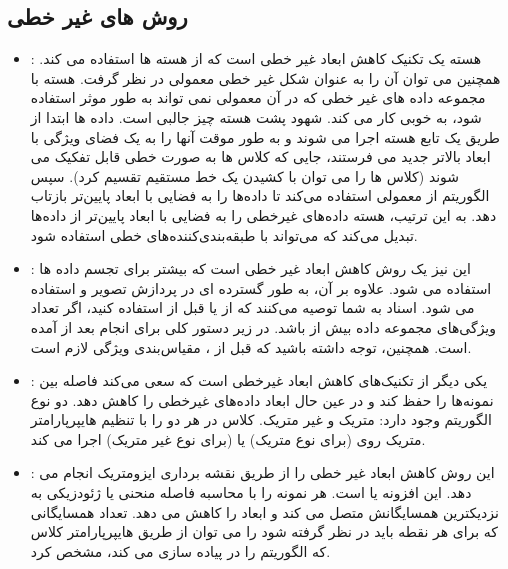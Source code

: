 \documentclass[12pt]{article}
\begin{document}
  \subsection{روش های غیر خطی}

\begin{itemize}
	
	\item 
	:
	هسته  یک تکنیک کاهش ابعاد غیر خطی است که از هسته ها استفاده می کند. همچنین می توان آن را به عنوان شکل غیر خطی  معمولی در نظر گرفت. هسته  با مجموعه داده های غیر خطی که در آن  معمولی نمی تواند به طور موثر استفاده شود، به خوبی کار می کند.
شهود پشت هسته  چیز جالبی است. داده ها ابتدا از طریق یک تابع هسته اجرا می شوند و به طور موقت آنها را به یک فضای ویژگی با ابعاد بالاتر جدید می فرستند، جایی که کلاس ها به صورت خطی قابل تفکیک می شوند (کلاس ها را می توان با کشیدن یک خط مستقیم تقسیم کرد). سپس الگوریتم از  معمولی استفاده می‌کند تا داده‌ها را به فضایی با ابعاد پایین‌تر بازتاب دهد. به این ترتیب، هسته  داده‌های غیرخطی را به فضایی با ابعاد پایین‌تر از داده‌ها تبدیل می‌کند که می‌تواند با طبقه‌بندی‌کننده‌های خطی استفاده شود.
	
	\item 
	:
	این نیز یک روش کاهش ابعاد غیر خطی است که بیشتر برای تجسم داده ها استفاده می شود. علاوه بر آن، به طور گسترده ای در پردازش تصویر و  استفاده می شود. اسناد  به شما توصیه می‌کنند که از  یا  قبل از  استفاده کنید، اگر تعداد ویژگی‌های مجموعه داده بیش از  باشد. در زیر دستور کلی برای انجام  بعد از  آمده است. همچنین، توجه داشته باشید که قبل از ، مقیاس‌بندی ویژگی لازم است.
	\item 
	:
	 یکی دیگر از تکنیک‌های کاهش ابعاد غیرخطی است که سعی می‌کند فاصله بین نمونه‌ها را حفظ کند و در عین حال ابعاد داده‌های غیرخطی را کاهش دهد. دو نوع الگوریتم  وجود دارد: متریک و غیر متریک. کلاس  در  هر دو را با تنظیم هایپرپارامتر متریک روی  (برای نوع متریک) یا  (برای نوع غیر متریک) اجرا می کند.
	\item 
	:
	این روش کاهش ابعاد غیر خطی را از طریق نقشه برداری ایزومتریک انجام می دهد. این افزونه  یا  است. هر نمونه را با محاسبه فاصله منحنی یا ژئودزیکی به نزدیکترین همسایگانش متصل می کند و ابعاد را کاهش می دهد. تعداد همسایگانی که برای هر نقطه باید در نظر گرفته شود را می توان از طریق هایپرپارامتر  کلاس  که الگوریتم  را در  پیاده سازی می کند، مشخص کرد.
\end{itemize}
\end{document}
